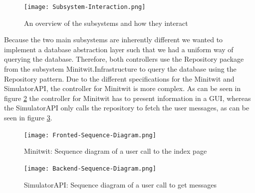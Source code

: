 \begin{figure}[H]
    \begin{center}
        \texttt{[image: Subsystem-Interaction.png]}
    \end{center}
    \caption{An overview of the subsystems and how they interact}
    \label{fig:subsystem-interaction}
\end{figure}

Because the two main subsystems are inherently different we wanted to implement a database abstraction layer such that we had a uniform way of querying the database. Therefore, both controllers use the Repository package from the subsystem Minitwit.Infrastructure to query the database using the Repository pattern\cite{repo_pattern}.
Due to the different specifications for the Minitwit and SimulatorAPI, the controller for Minitwit is more complex. As can be seen in figure \ref{fig:frontend-interaction} the controller for Minitwit has to present information in a GUI, whereas the SimulatorAPI only calls the repository to fetch the user messages, as can be seen in figure \ref{fig:backend-interaction}.
\begin{figure}[H]
    \begin{center}
        \texttt{[image: Fronted-Sequence-Diagram.png]}
    \end{center}
    \caption{Minitwit: Sequence diagram of a user call to the index page}
    \label{fig:frontend-interaction}
\end{figure}
\begin{figure}[H]
    \begin{center}
        \texttt{[image: Backend-Sequence-Diagram.png]}
    \end{center}
    \caption{SimulatorAPI: Sequence diagram of a user call to get messages}
    \label{fig:backend-interaction}
\end{figure}



